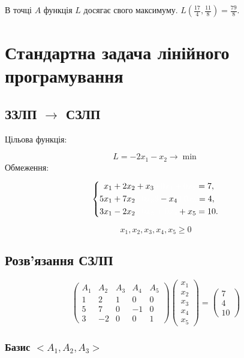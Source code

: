 \documentclass[a4paper, 12pt]{article}
\begin{document}
В точці $A$ функція $L$ досягає свого максимуму.
$L\left(\frac{17}{4},\frac{11}{8}\right) = \frac{79}{8}. $


\section{Стандартна задача лінійного програмування}

\subsection{ЗЗЛП $\rightarrow$ СЗЛП}

Цільова функція:

\begin{equation}
L = -2x_1 - x_2 \rightarrow \min
\end{equation}
Обмеження:

\[
\left\{
\begin{aligned}
	x_1 &+ 2x_2 + x_3 \textcolor{white}{+ 0x_4 + 0x_5} = 7,\\
	5x_1 &+ 7x_2 \textcolor{white}{+ 0x_33} - x_4 \textcolor{white}{+ 0x_5} = 4,\\
	3x_1 &- 2x_2 \textcolor{white}{+ 0x_3 + 0x_4} + x_5 = 10.\\ 
\end{aligned}
\right.
\]

\[ x_1, x_2, x_3, x_4, x_5 \geq 0 \]

\subsection{Розв'язання СЗЛП}

\[ \begin{pmatrix}
A_1 & A_2 & A_3 & A_4 & A_5\\
1 & 2 & 1 & 0 & 0\\
5 & 7 & 0 & -1 & 0\\
3 & -2 & 0 & 0 & 1
\end{pmatrix}
\begin{pmatrix}
x_1\\
x_2\\
x_3\\
x_4\\
x_5
\end{pmatrix} = 
\begin{pmatrix}
7\\
4\\
10
\end{pmatrix} \]

\subsubsection{Базис $<A_1, A_2, A_3>$}
\end{document}
